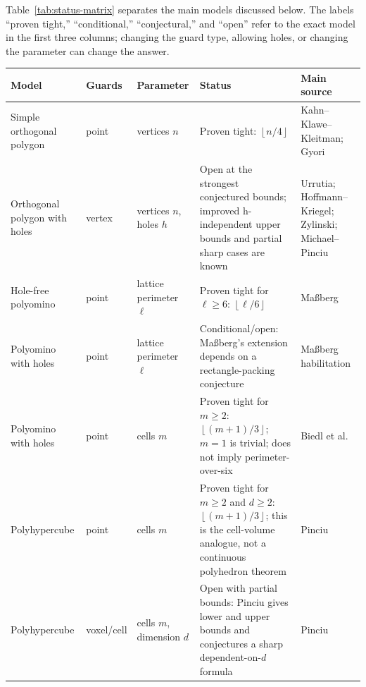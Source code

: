 \documentclass[11pt]{article}
\newcommand{\floor}[1]{\left\lfloor #1 \right\rfloor}
\newcommand{\loversix}{\floor{\ell/6}}
\begin{document}
Table~\ref{tab:status-matrix} separates the main models discussed below.  The
labels ``proven tight,'' ``conditional,'' ``conjectural,'' and ``open'' refer
to the exact model in the first three columns; changing the guard type,
allowing holes, or changing the parameter can change the answer.

\begin{table}[htbp]
\small
\setlength{\tabcolsep}{3.5pt}
\renewcommand{\arraystretch}{1.16}
\begin{tabularx}{\textwidth}{
  >{\raggedright\arraybackslash}p{}
  >{\raggedright\arraybackslash}p{}
  >{\raggedright\arraybackslash}p{}
  Y
  >{\raggedright\arraybackslash}p{0.17\textwidth}}
\toprule
Model & Guards & Parameter & Status & Main source \\
\midrule
Simple orthogonal polygon & point & vertices $n$ &
Proven tight: $\floor{n/4}$ & Kahn--Klawe--Kleitman; Gyori
\cite{KahnKlaweKleitman1983,Gyori1986} \\

Orthogonal polygon with holes & vertex & vertices $n$, holes $h$ &
Open at the strongest conjectured bounds; improved h-independent upper bounds
and partial sharp cases are known & Urrutia; Hoffmann--Kriegel; Zylinski;
Michael--Pinciu
\cite{UrrutiaOpenProblems,HoffmannKriegel1996,Zylinski2006,MichaelPinciu2016} \\

Hole-free polyomino & point & lattice perimeter $\ell$ &
Proven tight for $\ell\geq 6$: $\loversix$ & Ma{\ss}berg
\cite[Theorem~1]{Massberg2014} \\

Polyomino with holes & point & lattice perimeter $\ell$ &
Conditional/open: Ma{\ss}berg's extension depends on a rectangle-packing
conjecture & Ma{\ss}berg habilitation
\cite[Conj.~6.10]{MassbergHabilitation} \\

Polyomino with holes & point & cells $m$ &
Proven tight for $m\geq 2$: $\floor{(m+1)/3}$; $m=1$ is trivial; does not
imply perimeter-over-six & Biedl et al. \cite[Cor.~1]{BiedlEtAl2012} \\

Polyhypercube & point & cells $m$ &
Proven tight for $m\geq 2$ and $d\geq 2$: $\floor{(m+1)/3}$; this is the
cell-volume analogue, not a continuous polyhedron theorem & Pinciu
\cite{Pinciu2015} \\

Polyhypercube & voxel/cell & cells $m$, dimension $d$ &
Open with partial bounds: Pinciu gives lower and upper bounds and conjectures
a sharp dependent-on-$d$ formula & Pinciu \cite{Pinciu2015} \\


\end{tabularx}
\end{table}
\end{document}
